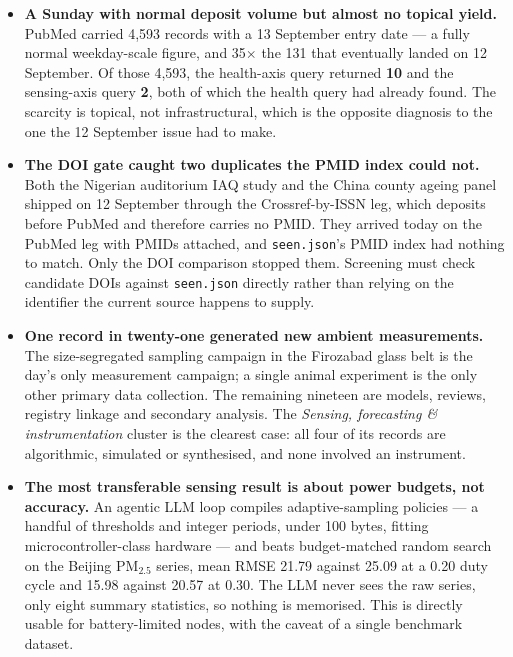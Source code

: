 \documentclass[10pt]{article}
\begin{document}
\footnotesize
\begin{itemize}
\item \textbf{A Sunday with normal deposit volume but almost no topical yield.}
PubMed carried 4{,}593 records with a 13 September entry date --- a fully normal weekday-scale
figure, and 35$\times$ the 131 that eventually landed on 12 September. Of those 4{,}593,
the health-axis query returned \textbf{10} and the sensing-axis query \textbf{2}, both of
which the health query had already found. The scarcity is topical, not infrastructural,
which is the opposite diagnosis to the one the 12 September issue had to make.

\item \textbf{The DOI gate caught two duplicates the PMID index could not.} Both the
Nigerian auditorium IAQ study and the China county ageing panel shipped on 12 September
through the Crossref-by-ISSN leg, which deposits before PubMed and therefore carries no
PMID. They arrived today on the PubMed leg with PMIDs attached, and \texttt{seen.json}'s
PMID index had nothing to match. Only the DOI comparison stopped them. Screening must
check candidate DOIs against \texttt{seen.json} directly rather than relying on the
identifier the current source happens to supply.

\item \textbf{One record in twenty-one generated new ambient measurements.} The
size-segregated sampling campaign in the Firozabad glass belt is the day's only
measurement campaign; a single animal experiment is the only other primary data
collection. The remaining nineteen are models, reviews, registry linkage and secondary
analysis. The \textit{Sensing, forecasting \& instrumentation} cluster is the clearest
case: all four of its records are algorithmic, simulated or synthesised, and none
involved an instrument.

\item \textbf{The most transferable sensing result is about power budgets, not accuracy.}
An agentic LLM loop compiles adaptive-sampling policies --- a handful of thresholds and
integer periods, under 100 bytes, fitting microcontroller-class hardware --- and beats
budget-matched random search on the Beijing PM$_{2.5}$ series, mean RMSE 21.79 against
25.09 at a 0.20 duty cycle and 15.98 against 20.57 at 0.30. The LLM never sees the raw
series, only eight summary statistics, so nothing is memorised. This is directly usable
for battery-limited nodes, with the caveat of a single benchmark dataset.


\end{itemize}
\end{document}
